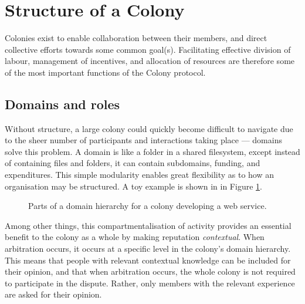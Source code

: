 \section{Structure of a Colony}\label{sec:colony-structure}
Colonies exist to enable collaboration between their members, and direct collective efforts towards some common goal(s). Facilitating effective division of labour, management of incentives, and allocation of resources are therefore some of the most important functions of the Colony protocol.

\subsection{Domains and roles}\label{sec:domains}\label{sec:roles}

Without structure, a large colony could quickly become difficult to navigate due to the sheer number of participants and interactions taking place --- domains solve this problem. A domain is like a folder in a shared filesystem, except instead of containing files and folders, it can contain subdomains, funding, and expenditures. This simple modularity enables great flexibility as to how an organisation may be structured. A toy example is shown in in Figure \ref{fig:domainhierarchysample}.

\begin{figure}[h]
    \centering
 \caption{Parts of a domain hierarchy for a colony developing a web service.}
 \label{fig:domainhierarchysample}

\end{figure}

Among other things, this compartmentalisation of activity provides an essential benefit to the colony as a whole by making reputation \textit{contextual}. When arbitration occurs, it occurs at a specific level in the colony's domain hierarchy. This means that people with relevant contextual knowledge can be included for their opinion, and that when arbitration occurs, the whole colony is not required to participate in the dispute. Rather, only members with the relevant experience are asked for their opinion.

